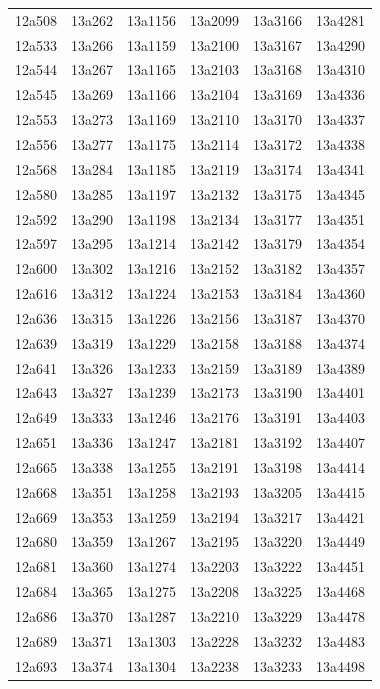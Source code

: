 \documentclass[12pt, oneside]{amsart}
\begin{document}
{\begin{longtable}{*{6}{>{\raggedright\arraybackslash}p{}}}
12a508 & 13a262 & 13a1156 & 13a2099 & 13a3166 & 13a4281 \\
12a533 & 13a266 & 13a1159 & 13a2100 & 13a3167 & 13a4290 \\
12a544 & 13a267 & 13a1165 & 13a2103 & 13a3168 & 13a4310 \\
12a545 & 13a269 & 13a1166 & 13a2104 & 13a3169 & 13a4336 \\
12a553 & 13a273 & 13a1169 & 13a2110 & 13a3170 & 13a4337 \\
12a556 & 13a277 & 13a1175 & 13a2114 & 13a3172 & 13a4338 \\
12a568 & 13a284 & 13a1185 & 13a2119 & 13a3174 & 13a4341 \\
12a580 & 13a285 & 13a1197 & 13a2132 & 13a3175 & 13a4345 \\
12a592 & 13a290 & 13a1198 & 13a2134 & 13a3177 & 13a4351 \\
12a597 & 13a295 & 13a1214 & 13a2142 & 13a3179 & 13a4354 \\
12a600 & 13a302 & 13a1216 & 13a2152 & 13a3182 & 13a4357 \\
12a616 & 13a312 & 13a1224 & 13a2153 & 13a3184 & 13a4360 \\
12a636 & 13a315 & 13a1226 & 13a2156 & 13a3187 & 13a4370 \\
12a639 & 13a319 & 13a1229 & 13a2158 & 13a3188 & 13a4374 \\
12a641 & 13a326 & 13a1233 & 13a2159 & 13a3189 & 13a4389 \\
12a643 & 13a327 & 13a1239 & 13a2173 & 13a3190 & 13a4401 \\
12a649 & 13a333 & 13a1246 & 13a2176 & 13a3191 & 13a4403 \\
12a651 & 13a336 & 13a1247 & 13a2181 & 13a3192 & 13a4407 \\
12a665 & 13a338 & 13a1255 & 13a2191 & 13a3198 & 13a4414 \\
12a668 & 13a351 & 13a1258 & 13a2193 & 13a3205 & 13a4415 \\
12a669 & 13a353 & 13a1259 & 13a2194 & 13a3217 & 13a4421 \\
12a680 & 13a359 & 13a1267 & 13a2195 & 13a3220 & 13a4449 \\
12a681 & 13a360 & 13a1274 & 13a2203 & 13a3222 & 13a4451 \\
12a684 & 13a365 & 13a1275 & 13a2208 & 13a3225 & 13a4468 \\
12a686 & 13a370 & 13a1287 & 13a2210 & 13a3229 & 13a4478 \\
12a689 & 13a371 & 13a1303 & 13a2228 & 13a3232 & 13a4483 \\
12a693 & 13a374 & 13a1304 & 13a2238 & 13a3233 & 13a4498 \\

\end{longtable}}
\end{document}
